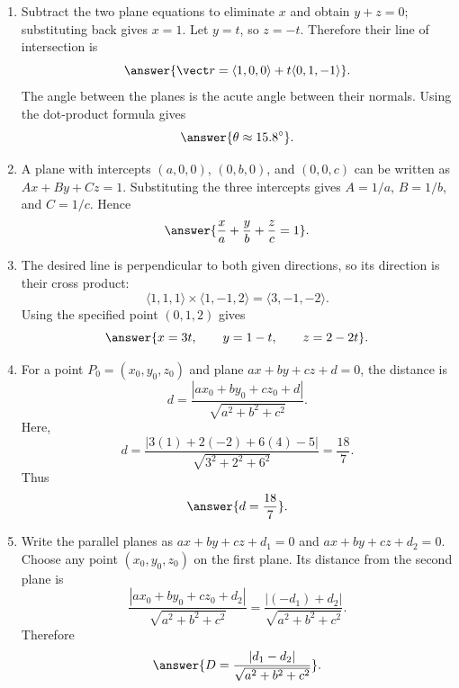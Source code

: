 \begin{enumerate}[label=\textbf{\arabic*.}, start=3]
\[\]
Thus
\[
\cos\theta=\frac{3}{3\sqrt6}=\frac1{\sqrt6},
\qquad
\answer{\theta=\cos^{-1}(1/\sqrt6)\approx65.9^\circ}.
\]
The normals are neither scalar multiples nor orthogonal, so the planes are neither parallel nor perpendicular.
\setcounter{enumi}{56}
\item Subtract the two plane equations to eliminate $x$ and obtain $y+z=0$; substituting back gives $x=1$.  Let $y=t$, so $z=-t$.  Therefore their line of intersection is
\[
\answer{\vect r=\langle1,0,0\rangle+t\langle0,1,-1\rangle}.
\]
The angle between the planes is the acute angle between their normals.  Using the dot-product formula gives \[\answer{\theta\approx15.8^\circ}.\]
\setcounter{enumi}{62}
\item A plane with intercepts $(a,0,0)$, $(0,b,0)$, and $(0,0,c)$ can be written as $Ax+By+Cz=1$.  Substituting the three intercepts gives $A=1/a$, $B=1/b$, and $C=1/c$.  Hence
\[\answer{\frac{x}{a}+\frac{y}{b}+\frac{z}{c}=1}.\]
\setcounter{enumi}{64}
\item The desired line is perpendicular to both given directions, so its direction is their cross product:
\[
\langle1,1,1\rangle\times\langle1,-1,2\rangle
=\langle3,-1,-2\rangle.
\]
Using the specified point $(0,1,2)$ gives
\[\answer{x=3t,\qquad y=1-t,\qquad z=2-2t}.\]
\setcounter{enumi}{70}
\item For a point $P_0=(x_0,y_0,z_0)$ and plane $ax+by+cz+d=0$, the distance is
\[
d=\frac{|ax_0+by_0+cz_0+d|}{\sqrt{a^2+b^2+c^2}}.
\]
Here,
\[
d=\frac{|3(1)+2(-2)+6(4)-5|}{\sqrt{3^2+2^2+6^2}}
=\frac{18}{7}.
\]
Thus \[\answer{d=\frac{18}{7}}.\]
\setcounter{enumi}{74}
\item Write the parallel planes as $ax+by+cz+d_1=0$ and $ax+by+cz+d_2=0$.  Choose any point $(x_0,y_0,z_0)$ on the first plane.  Its distance from the second plane is
\[
\frac{|ax_0+by_0+cz_0+d_2|}{\sqrt{a^2+b^2+c^2}}
=\frac{|(-d_1)+d_2|}{\sqrt{a^2+b^2+c^2}}.
\]
Therefore \[\answer{D=\frac{|d_1-d_2|}{\sqrt{a^2+b^2+c^2}}}.\]
\end{enumerate}

